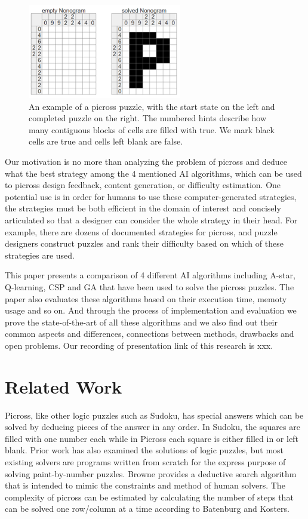 \documentclass{svproc}
\begin{document}
\begin{figure}[h]
  \centering
  \includegraphics[width=0.6\textwidth]{picross1.png}
  \caption{An example of a picross puzzle, with the start state on the left and completed puzzle on the right. The numbered hints describe how many contiguous blocks of cells are filled with true. We mark black cells are true and cells left blank are false.}
\end{figure}

Our motivation is no more than analyzing the problem of picross and deduce what the best strategy among the 4 mentioned AI algorithms, which can be used to picross design feedback, content generation, or difficulty estimation. One potential use is in order for humans to use these computer-generated strategies, the strategies must be both efficient in the domain of interest and concisely articulated so that a designer can consider the whole strategy in their head. For example, there are dozens of documented strategies for picross\cite{picross1}, and puzzle designers construct puzzles and rank their difficulty based on which of these strategies are used\cite{picross2}.

This paper presents a comparison of 4 different AI algorithms including A-star, Q-learning, CSP and GA that have been used to solve the picross puzzles. The paper also evaluates these algorithms based on their execution time, memoty usage and so on. And through the process of implementation and evaluation we prove the state-of-the-art of all these algorithms and we also find out their common aspects and differences, connections between methods, drawbacks and open problems. Our recording of presentation link of this research is xxx.


\section{Related Work}
Picross, like other logic puzzles such as Sudoku, has special answers which can be solved by deducing pieces of the answer in any order. In Sudoku, the squares are filled with one number each while in Picross each square is either filled in or left blank. Prior work has also examined the solutions of logic puzzles, but most existing solvers are programs written from scratch for the express purpose of solving paint-by-number puzzles\cite{5.1.1,5.1.2,5.1.3,5.1.7}. Browne provides a deductive search algorithm that is intended to mimic the constraints and method of human solvers\cite{Browne}. The complexity of picross can be estimated by calculating the number of steps that can be solved one row/column at a time according to Batenburg and Kosters\cite{Batenburg and Kosters}.
\end{document}
